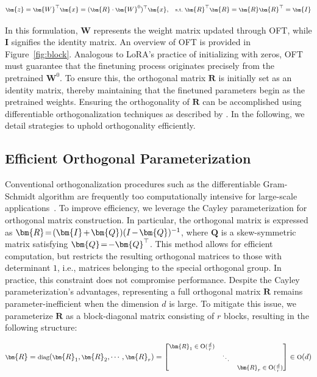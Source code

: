 \begin{equation}\label{eq:oft_general}
    \footnotesize
    \bm{z}=\bm{W}^\top\bm{x}=(\bm{R}\cdot\bm{W}^0)^\top\bm{x},~~~\text{s.t.}~\bm{R}^\top\bm{R}=\bm{R}\bm{R}^\top=\bm{I}
\end{equation}

In this formulation, $\bm{W}$ represents the weight matrix updated through OFT, while $\bm{I}$ signifies the identity matrix. An overview of OFT is provided in Figure~\ref{fig:block}. Analogous to LoRA's practice of initializing with zeros, OFT must guarantee that the finetuning process originates precisely from the pretrained $\bm{W}^0$. To ensure this, the orthogonal matrix $\bm{R}$ is initially set as an identity matrix, thereby maintaining that the finetuned parameters begin as the pretrained weights. Ensuring the orthogonality of $\bm{R}$ can be accomplished using differentiable orthogonalization techniques as described by \cite{liu2021orthogonal,lezcano2019cheap}. In the following, we detail strategies to uphold orthogonality efficiently.

\subsection{Efficient Orthogonal Parameterization}\label{sect:eff_ortho}

Conventional orthogonalization procedures such as the differentiable Gram-Schmidt algorithm are frequently too computationally intensive for large-scale applications~\cite{liu2021orthogonal}. To improve efficiency, we leverage the Cayley parameterization for orthogonal matrix construction. In particular, the orthogonal matrix is expressed as $\thickmuskip=2mu \medmuskip=2mu \bm{R}=(\bm{I}+\bm{Q})(I-\bm{Q})^{-1}$, where $\bm{Q}$ is a skew-symmetric matrix satisfying $\thickmuskip=2mu \medmuskip=2mu \bm{Q}=-\bm{Q}^\top$. This method allows for efficient computation, but restricts the resulting orthogonal matrices to those with determinant $1$, i.e., matrices belonging to the special orthogonal group. In practice, this constraint does not compromise performance. Despite the Cayley parameterization’s advantages, representing a full orthogonal matrix $\bm{R}$ remains parameter-inefficient when the dimension $d$ is large. To mitigate this issue, we parameterize $\bm{R}$ as a block-diagonal matrix consisting of $r$ blocks, resulting in the following structure:

\begin{equation}
    \footnotesize
    \bm{R}=\text{diag}(\bm{R}_1,\bm{R}_2,\cdots,\bm{R}_r)=\begin{bmatrix}
    \bm{R}_1\in \text{O}(\frac{d}{r}) &  &\\
    &\ddots & \\
    & & \bm{R}_r\in \text{O}(\frac{d}{r})
    \end{bmatrix}\in \text{O}(d)
\end{equation}

